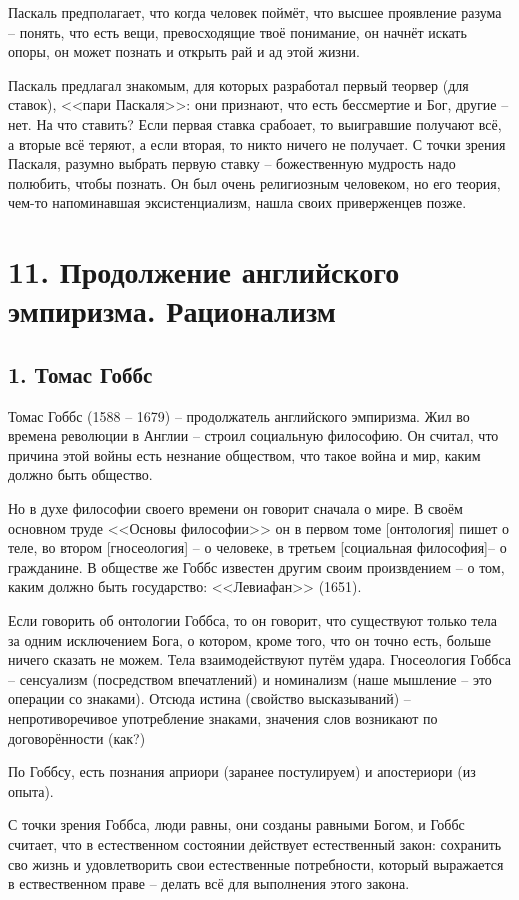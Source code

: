\documentclass[a4paper, 12pt]{book} %
\begin{document}
Паскаль предполагает, что когда человек поймёт, что высшее проявление разума -- понять, что есть вещи, превосходящие твоё понимание, он начнёт искать опоры, он может познать и открыть рай и ад этой жизни.

Паскаль предлагал знакомым, для которых разработал первый теорвер (для ставок), <<пари Паскаля>>: они признают, что есть бессмертие и Бог, другие -- нет. На что ставить? Если первая ставка срабоает, то выигравшие получают всё, а вторые всё теряют, а если вторая, то никто ничего не получает. С точки зрения Паскаля, разумно выбрать первую ставку -- божественную мудрость надо полюбить, чтобы познать. Он был очень религиозным человеком, но его теория, чем-то напоминавшая эксистенциализм, нашла своих приверженцев позже.

\section*{11. Продолжение английского эмпиризма. Рационализм}
\subsection*{1. Томас Гоббс}
Томас Гоббс (1588 -- 1679) -- продолжатель английского эмпиризма. Жил во времена революции в Англии -- строил социальную философию. Он считал, что причина этой войны есть незнание обществом, что такое война и мир, каким должно быть общество.

Но в духе философии своего времени он говорит сначала о мире. В своём основном труде <<Основы философии>> он в первом томе [онтология] пишет о теле, во втором [гносеология] -- о человеке, в третьем [социальная философия]-- о гражданине. В обществе же Гоббс известен другим своим произвдением -- о том, каким должно быть государство: <<Левиафан>> (1651).

Если говорить об онтологии Гоббса, то он говорит, что существуют только тела за одним исключением Бога, о котором, кроме того, что он точно есть, больше ничего сказать не можем. Тела взаимодействуют путём удара. Гносеология Гоббса -- сенсуализм (посредством впечатлений) и номинализм (наше мышление -- это операции со знаками). Отсюда истина (свойство высказываний) -- непротиворечивое употребление знаками, значения слов возникают по договорённости (как?)

По Гоббсу, есть познания априори (заранее постулируем) и апостериори (из опыта).

С точки зрения Гоббса, люди равны, они созданы равными Богом, и Гоббс считает, что в естественном состоянии действует естественный закон: сохранить сво жизнь и удовлетворить свои естественные потребности, который выражается в ествественном праве -- делать всё для выполнения этого закона. 
\end{document}

